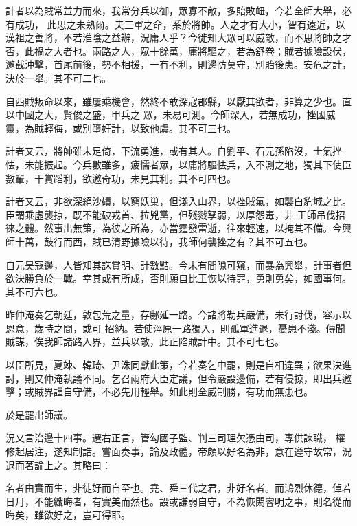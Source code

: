 \begin{pinyinscope}
 計者以為賊常並力而來，我常分兵以御，眾寡不敵，多貽敗衄，今若全師大舉，必有成功，
 此思之未熟爾。夫三軍之命，系於將帥。人之才有大小，智有遠近，以漢祖之善將，不若淮陰之益辦，況庸人乎？今徙知大眾可以威敵，而不思將帥之才否，此禍之大者也。兩路之人，眾十餘萬，庸將驅之，若為舒卷；賊若據險設伏，邀截沖擊，首尾前後，勢不相援，一有不利，則邊防莫守，別貽後患。安危之計，決於一舉。其不可二也。



 自西賊叛命以來，雖屢乘機會，然終不敢深寇郡縣，以厭其欲者，非算之少也。直以中國之大，賢俊之盛，甲兵之
 眾，未易可測。今師深入，若無成功，挫國威靈，為賊輕侮，或別墮奸計，以致他虞。其不可三也。



 計者又云，將帥雖未足倚，下流勇進，或有其人。自劉平、石元孫陷沒，士氣挫怯，未能振起。今兵數雖多，疲懦者眾，以庸將驅怯兵，入不測之地，獨其下使臣數輩，干賞蹈利，欲邀奇功，未見其利。其不可四也。



 計者又云，非欲深絕沙磧，以窮妖巢，但淺入山界，以挫賊氣，如襲白豹城之比。臣謂乘虛襲掠，既不能破戎首、拉兇黨，但殘戮孥弱，以厚怨毒，非
 王師吊伐招徠之體。然事出無策，為彼之所為，亦當霆發雷逝，往來輕速，以掩其不備。今興師十萬，鼓行而西，賊已清野據險以待，我師何襲挫之有？其不可五也。



 自元昊寇邊，人皆知其誅賞明、計數黠。今未有間隙可窺，而暴為興舉，計事者但欲決勝負於一戰。幸其或有所成，否則願自比王恢以待罪，勇則勇矣，如國事何。其不可六也。



 昨仲淹奏乞朝廷，敦包荒之量，存鄜延一路。今諸將勒兵嚴備，未行討伐，容示以恩意，歲時之間，或可
 招納。若使涇原一路獨入，則孤軍進退，憂患不淺。傳聞賊謀，俟我師諸路入界，並兵以敵，此正陷賊計中。其不可七也。



 以臣所見，夏竦、韓琦、尹洙同獻此策，今若奏乞中罷，則是自相違異；欲果決進討，則又仲淹執議不同。乞召兩府大臣定議，但令嚴設邊備，若有侵掠，即出兵邀擊；或賊界謹自守備，不必先用輕舉。如此則全威制勝，有功而無患也。



 於是罷出師議。



 況又言治邊十四事。遷右正言，管勾國子監、判三司理欠憑由司，專供諫職，
 權修起居注，遂知制誥。嘗面奏事，論及政體，帝頗以好名為非，意在遵守故常，況退而著論上之。其略曰：



 名者由實而生，非徒好而自至也。堯、舜三代之君，非好名者。而鴻烈休德，倬若日月，不能纖晦者，有實美而然也。設或謙弱自守，不為恢閎睿明之事，則名從而晦矣，雖欲好之，豈可得耶。




\end{pinyinscope}
